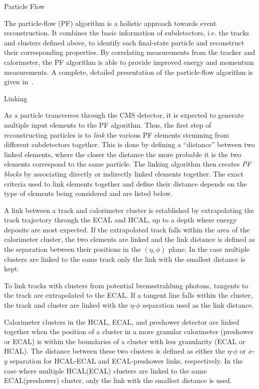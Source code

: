 \begin{section}{Particle Flow}

The particle-flow (PF) algorithm is a holistic approach towards event reconstruction.
It combines the basic information of subdetectors, i.e. the tracks and clusters defined above, to identify each final-state particle and reconstruct their corresponding properties.
By correlating measurements from the tracker and calorimeter, the PF algorithm is able to provide improved energy and momentum measurements. A complete, detailed presentation of the particle-flow algorithm is given in~\cite{1748-0221-12-10-P10003,CMS-PAS-PFT-09-001,CMS-PAS-PFT-10-001}.

\begin{subsection}{Linking}

As a particle transverses through the CMS detector, it is expected to generate multiple input elements to the PF algorithm.
Thus, the first step of reconstructing particles is to \textit{link} the various PF elements stemming from different subdetectors together.
This is done by defining a ``distance'' between two linked elements, where the closer the distance the more probable it is the two elements correspond to the same particle.
The linking algorithm then creates \textit{PF blocks} by associating directly or indirectly linked elements together.
The exact criteria used to link elements together and define their distance depends on the type of elements being considered and are listed below.

A link between a track and calorimeter cluster is established by extrapolating the track trajectory through the ECAL and HCAL, up to a depth where energy deposits are most expected.
If the extrapolated track falls within the area of the calorimeter cluster, the two elements are linked and the link distance is defined as the separation between their positions in the $(\eta,\phi)$ plane.
In the case multiple clusters are linked to the same track only the link with the smallest distance is kept.

To link tracks with clusters from potential bremsstrahlung photons, tangents to the track are extrapolated to the ECAL.
If a tangent line falls within the cluster, the track and cluster are linked with the $\eta$-$\phi$ separation used as the link distance.

Calorimeter clusters in the HCAL, ECAL, and preshower detector are linked together when the position of a cluster in a more granular calorimeter (preshower or ECAL) is within the boundaries of a cluster with less granularity (ECAL or HCAL).
The distance between these two clusters is defined as either the $\eta$-$\phi$ or $x$-$y$ separation for HCAL-ECAL and ECAL-preshower links, respectively.
In the case where multiple HCAL(ECAL) clusters are linked to the same ECAL(preshower) cluster, only the link with the smallest distance is used.


\end{subsection}
\end{section}
